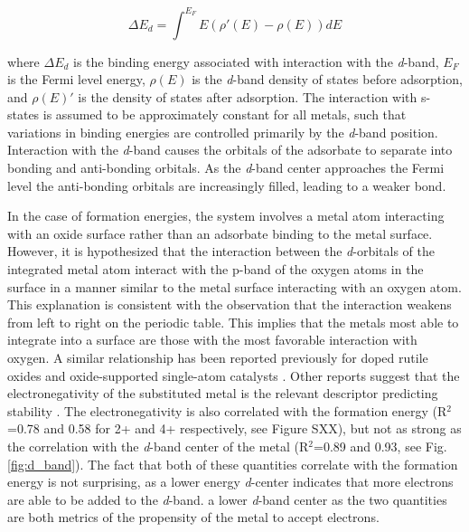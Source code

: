 \begin{equation}
    \Delta E_d = \int^{E_F} E(\rho'(E) - \rho(E))dE
    \label{eq:d_band}
\end{equation}

where $\Delta E_d$ is the binding energy associated with interaction with the \textit{d}-band, $E_F$ is the Fermi level energy, $\rho(E)$ is the \textit{d}-band density of states before adsorption, and $\rho(E)'$ is the density of states after adsorption. The interaction with s- states is assumed to be approximately constant for all metals, such that variations in binding energies are controlled primarily by the \textit{d}-band position. Interaction with the \textit{d}-band causes the orbitals of the adsorbate to separate into bonding and anti-bonding orbitals. As the \textit{d}-band center approaches the Fermi level the anti-bonding orbitals are increasingly filled, leading to a weaker bond.

In the case of formation energies, the system involves a metal atom interacting with an oxide surface rather than an adsorbate binding to the metal surface. However, it is hypothesized that the interaction between the \textit{d}-orbitals of the integrated metal atom interact with the p-band of the oxygen atoms in the surface in a manner similar to the metal surface interacting with an oxygen atom. This explanation is consistent with the observation that the interaction weakens from left to right on the periodic table. This implies that the metals most able to integrate into a surface are those with the most favorable interaction with oxygen. A similar relationship has been reported previously for doped rutile oxides \cite{Xu_2015} and oxide-supported single-atom catalysts \cite{O_Connor_2018}. Other reports suggest that the electronegativity of the substituted metal is the relevant descriptor predicting stability \cite{Garc_a_Mota_2011}. The electronegativity is also correlated with the formation energy (R$^2$=0.78 and 0.58 for 2+ and 4+ respectively, see Figure SXX), but not as strong as the correlation with the \textit{d}-band center of the metal (R$^2$=0.89 and 0.93, see Fig. \ref{fig:d_band}). The fact that both of these quantities correlate with the formation energy is not surprising, as a lower energy \textit{d}-center indicates that more electrons are able to be added to the \textit{d}-band. a lower \textit{d}-band center  as the two quantities are both metrics of the propensity of the metal to accept electrons.


